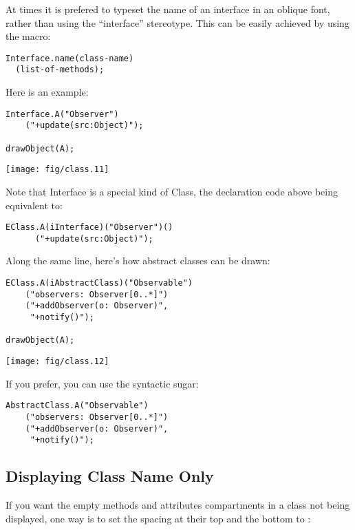 \documentclass{article}
\newcommand{\code}{\ttfamily}
\begin{document}
At times it is prefered to typeset the name of an interface in an oblique font, rather than using the ``interface'' stereotype. This can be easily achieved by using the macro:

\begin{verbatim}
Interface.name(class-name)
  (list-of-methods);
\end{verbatim}

Here is an example:

\begin{multicols}{2}
\begin{verbatim}
Interface.A("Observer")
    ("+update(src:Object)");

drawObject(A);
\end{verbatim}
\columnbreak
\hspace{1cm}\texttt{[image: fig/class.11]}
\end{multicols}

Note that {\code Interface} is a special kind of {\code Class}, the declaration code above being equivalent to:
\begin{verbatim}
EClass.A(iInterface)("Observer")()
      ("+update(src:Object)");
\end{verbatim}

Along the same line, here's how abstract classes can be drawn:

\begin{multicols}{2}
\begin{verbatim}
EClass.A(iAbstractClass)("Observable")
    ("observers: Observer[0..*]")
    ("+addObserver(o: Observer)",
     "+notify()");

drawObject(A);
\end{verbatim}
\columnbreak
\hspace{1cm}\texttt{[image: fig/class.12]}
\end{multicols}

If you prefer, you can use the syntactic sugar:

\begin{verbatim}
AbstractClass.A("Observable")
    ("observers: Observer[0..*]")
    ("+addObserver(o: Observer)",
     "+notify()");
\end{verbatim}

\subsection{Displaying Class Name Only}

If you want the empty methods and attributes compartments in a class not being displayed, one way is to set the spacing at their top and the bottom to {\code 0}:
\end{document}

